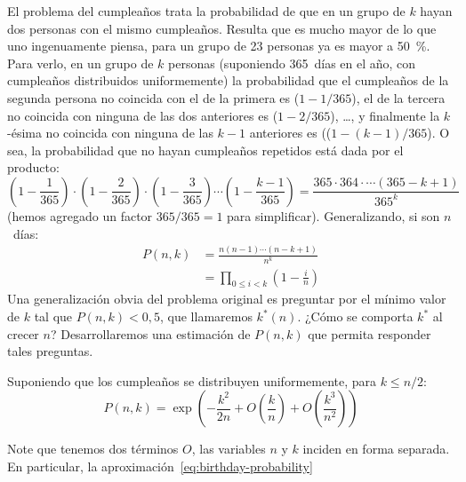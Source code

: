   El problema del cumpleaños trata la probabilidad
  de que en un grupo de \(k\) hayan dos personas con el mismo cumpleaños.
  Resulta que es mucho mayor de lo que uno ingenuamente piensa,
  para un grupo de \num{23} personas ya es mayor a \SI{50}{\percent}.
  Para verlo,
  en un grupo de \(k\) personas
  (suponiendo \num{365}~días en el año,
   con cumpleaños distribuidos uniformemente)
  la probabilidad que el cumpleaños de la segunda persona
  no coincida con el de la primera es
  (\(1 - 1 / 365\)),
  el de la tercera no coincida con ninguna de las dos anteriores es
  (\(1 - 2 / 365\)),
  \ldots,
  y finalmente la \(k\)\nobreakdash-ésima
  no coincida con ninguna de las \(k - 1\) anteriores es
  ((\(1 - (k - 1) / 365\)).
  O sea,
  la probabilidad que no hayan cumpleaños repetidos
  está dada por el producto:
  \begin{equation*}
    \left( 1 - \frac{1}{365} \right)
      \cdot \left( 1 - \frac{2}{365} \right)
      \cdot \left( 1 - \frac{3}{365} \right)
      \dotsm \left( 1 - \frac{k - 1}{365} \right)
      = \frac{365 \cdot 364 \cdot \dotsm (365 - k + 1)}{365^k}
  \end{equation*}
  (hemos agregado un factor \(365/365 = 1\) para simplificar).
  Generalizando,
  si son \(n\)~días:
  \begin{align*}
    P(n, k)
      &= \frac{n (n - 1) \dotsm (n - k + 1)}{n^k} \\
      &= \prod_{0 \le i < k} \left( 1 - \frac{i}{n} \right)
  \end{align*}
  Una generalización obvia del problema original
  es preguntar por el mínimo valor de \(k\) tal que \(P(n, k) <0,5\),
  que llamaremos \(k^*(n)\).
  ¿Cómo se comporta \(k^*\) al crecer \(n\)?
  Desarrollaremos una estimación de \(P(n, k)\)
  que permita responder tales preguntas.
  \begin{proposition}
    \label{prop:birthday-probability}
    Suponiendo que los cumpleaños se distribuyen uniformemente,
    para \(k \le n / 2\):
    \begin{equation}
      \label{eq:birthday-probability}
      P(n, k)
        = \exp \left(
                 - \frac{k^2}{2 n}
                   + O\left( \frac{k}{n} \right)
                   + O\left( \frac{k^3}{n^2} \right)
               \right)
    \end{equation}
  \end{proposition}
  Note que tenemos dos términos \(O\),
  las variables \(n\) y \(k\) inciden en forma separada.
  En particular,
  la aproximación~\eqref{eq:birthday-probability}
